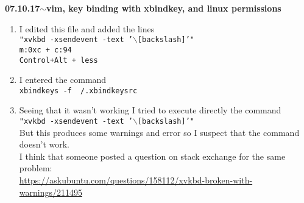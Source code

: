 \documentclass[11pt,a4paper]{article}
\newenvironment{loggentry}[2]%
{\noindent\textbf{#1}\hspace{1cm}$\mathbf{\sim}$\text{ }\textbf{#2}\\}{\vspace{0.5cm}}
\begin{document}
\begin{loggentry}{07.10.17}{vim, key binding with xbindkey, and linux permissions}
\begin{enumerate}[1)]
\texttt{xbindkeys -k}
\item I edited this file and added the lines\\
\texttt{"xvkbd -xsendevent -text '$\backslash$[backslash]'"}\\
\texttt{m:0xc + c:94}\\
\texttt{Control+Alt + less}
\item I entered the command \\
\texttt{xbindkeys -f ~/.xbindkeysrc}
\item Seeing that it wasn't working I tried to execute directly the command \\
\texttt{"xvkbd -xsendevent -text '$\backslash$[backslash]'"}\\
But this produces some warnings and error so I suspect that the command doesn't work.\\
I think that someone posted a question on stack exchange for the same problem:\\
\url{https://askubuntu.com/questions/158112/xvkbd-broken-with-warnings/211495}
\end{enumerate}
\end{loggentry}
\end{document}

